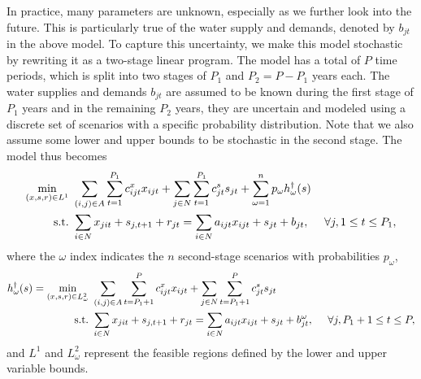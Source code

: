 \documentclass[11pt]{article}
\newcommand{\st}{\mbox{s.t.}}
\begin{document}
In practice, many parameters are unknown, especially as we further look into the future. 
This is particularly true of the water supply and demands, denoted by $b_{jt}$ in the above model. 
To capture this uncertainty, we make this model stochastic by rewriting it as a two-stage linear program.
The model has a total of $P$ time periods, which is split into two stages of $P_1$ and $P_2 = P - P_1$ years each. 
The water supplies and demands $b_{jt}$ are assumed to be known during the first stage of $P_1$ years and in the remaining $P_2$ years, they are uncertain and modeled using a discrete set of scenarios with a specific probability distribution.  
Note that we also assume some lower and upper bounds to be stochastic in the second stage. 
The model thus becomes
\begin{align}
	\min_{(x,s,r) \in L^1} \ & \sum_{(i,j) \in A} \sum_{t=1}^{P_1} c_{ijt}^x x_{ijt} + \sum_{j \in N} \sum_{t=1}^{P_1} c_{jt}^s s_{jt} + \sum_{\omega=1}^n p_\omega h^\dagger_\omega(s) \label{eq:gen_network_two_stage} \\
	\st \ & \sum_{i \in N} x_{jit} + s_{j,t+1} + r_{jt} = \sum_{i \in N} a_{ijt} x_{ijt} + s_{jt} + b_{jt},\ \ \ \ \forall j, 1 \leq t \leq P_1, \notag
\end{align}
where the $\omega$ index indicates the $n$ second-stage scenarios with probabilities $p_\omega$,
\begin{align}
	h^\dagger_\omega(s) = \min_{(x,s,r) \in L^2_\omega} \ & \sum_{(i,j) \in A} \sum_{t=P_1+1}^{P} c_{ijt}^x x_{ijt} + \sum_{j \in N} \sum_{t=P_1+1}^{P} c_{jt}^s s_{jt} \label{eq:gen_network_second_stage} \\
	\st \ & \sum_{i \in N} x_{jit} + s_{j,t+1} + r_{jt} = \sum_{i \in N} a_{ijt} x_{ijt} + s_{jt} + b_{jt}^\omega, \ \ \ \ \forall j, P_1+1 \leq t \leq P, \notag
\end{align}
and $L^1$ and $L^2_\omega$ represent the feasible regions defined by the lower and upper variable bounds.
\end{document}
